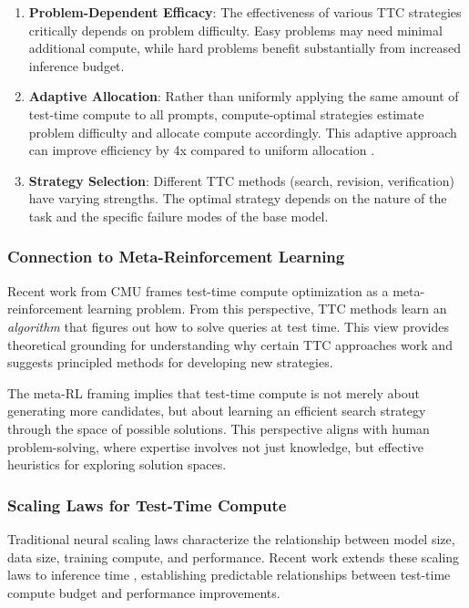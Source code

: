 \begin{enumerate}
    \item \textbf{Problem-Dependent Efficacy}: The effectiveness of various TTC strategies critically depends on problem difficulty. Easy problems may need minimal additional compute, while hard problems benefit substantially from increased inference budget.
    
    \item \textbf{Adaptive Allocation}: Rather than uniformly applying the same amount of test-time compute to all prompts, compute-optimal strategies estimate problem difficulty and allocate compute accordingly. This adaptive approach can improve efficiency by 4x compared to uniform allocation \citep{snell2024scaling}.
    
    \item \textbf{Strategy Selection}: Different TTC methods (search, revision, verification) have varying strengths. The optimal strategy depends on the nature of the task and the specific failure modes of the base model.
\end{enumerate}

\subsubsection{Connection to Meta-Reinforcement Learning}

Recent work from CMU \citep{cmu2025metarl} frames test-time compute optimization as a meta-reinforcement learning problem. From this perspective, TTC methods learn an \textit{algorithm} that figures out how to solve queries at test time. This view provides theoretical grounding for understanding why certain TTC approaches work and suggests principled methods for developing new strategies.

The meta-RL framing implies that test-time compute is not merely about generating more candidates, but about learning an efficient search strategy through the space of possible solutions. This perspective aligns with human problem-solving, where expertise involves not just knowledge, but effective heuristics for exploring solution spaces.

\subsubsection{Scaling Laws for Test-Time Compute}

Traditional neural scaling laws \citep{kaplan2020scaling} characterize the relationship between model size, data size, training compute, and performance. Recent work extends these scaling laws to inference time \citep{arxiv2024inference}, establishing predictable relationships between test-time compute budget and performance improvements.

